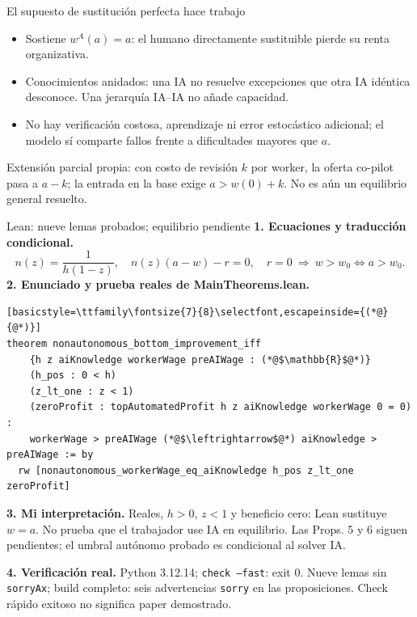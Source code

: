 \documentclass[aspectratio=169,11pt]{beamer}
\begin{document}
\begin{frame}{El supuesto de sustitución perfecta hace trabajo}
\begin{itemize}
\item Sostiene $w^A(a)=a$: el humano directamente sustituible pierde su renta organizativa.
\item Conocimientos anidados: una IA no resuelve excepciones que otra IA idéntica desconoce. Una jerarquía IA--IA no añade capacidad.
\item No hay verificación costosa, aprendizaje ni error estocástico adicional; el modelo sí comparte fallos frente a dificultades mayores que $a$.
\end{itemize}
\begin{keybox}Extensión parcial propia: con costo de revisión $k$ por worker, la oferta co-pilot pasa a $a-k$; la entrada en la base exige $a>w(0)+k$. No es aún un equilibrio general resuelto.\end{keybox}
\end{frame}

\begin{frame}[fragile]{Lean: nueve lemas probados; equilibrio pendiente}
\footnotesize
\textbf{1. Ecuaciones y traducción condicional.}
\[
n(z)=\frac{1}{h(1-z)},\quad n(z)(a-w)-r=0,\quad r=0
\ \Longrightarrow\ w>w_0\iff a>w_0.
\]
\textbf{2. Enunciado y prueba reales de MainTheorems.lean.}
\begin{lstlisting}[basicstyle=\ttfamily\fontsize{7}{8}\selectfont,escapeinside={(*@}{@*)}]
theorem nonautonomous_bottom_improvement_iff
    {h z aiKnowledge workerWage preAIWage : (*@$\mathbb{R}$@*)}
    (h_pos : 0 < h)
    (z_lt_one : z < 1)
    (zeroProfit : topAutomatedProfit h z aiKnowledge workerWage 0 = 0) :
    workerWage > preAIWage (*@$\leftrightarrow$@*) aiKnowledge > preAIWage := by
  rw [nonautonomous_workerWage_eq_aiKnowledge h_pos z_lt_one zeroProfit]
\end{lstlisting}
\textbf{3. Mi interpretación.} Reales, $h>0$, $z<1$ y beneficio cero: Lean sustituye $w=a$. \alert{No prueba que el trabajador use IA en equilibrio.} Las Props. 5 y 6 siguen pendientes; el umbral autónomo probado es condicional al solver IA.

\medskip
\textbf{4. Verificación real.} Python 3.12.14; \texttt{check --fast}: exit 0. Nueve lemas sin \texttt{sorryAx}; build completo: seis advertencias \texttt{sorry} en las proposiciones. \alert{Check rápido exitoso no significa paper demostrado.}
\end{frame}
\end{document}
